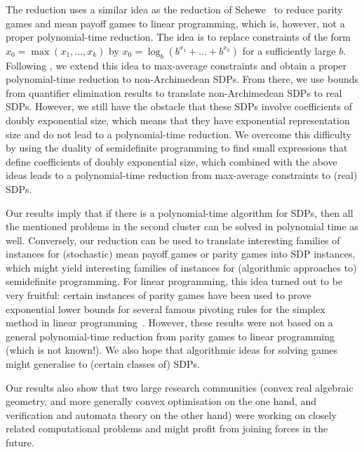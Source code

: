 \documentclass[11pt]{article}
\theoremstyle{definition}
\theoremstyle{remark}
\begin{document}
The reduction uses a similar idea as the reduction of Schewe~\cite{schewe2009parity} 
to reduce parity games and mean payoff games to linear programming, which is, however, not a proper polynomial-time reduction. The idea is to replace constraints of the form $x_0 = \max(x_1,\dots,x_k)$ by
$x_0 = \log_b(b^{x_1} + \dots + b^{x_k})$
for a sufficiently large $b$.
Following \cite{issac2016jsc}, we extend this idea to max-average constraints and obtain a proper polynomial-time reduction to non-Archimedean SDPs. 
From there, we use bounds from quantifier elimination results to translate non-Archimedean SDPs to real SDPs. However, we still have the obstacle that these SDPs involve coefficients of doubly exponential size, which means that they have exponential representation size and do not lead to a polynomial-time reduction. We overcome this difficulty by using the duality of semidefinite programming to find small expressions that define coefficients of doubly exponential size, which combined with the above ideas leads to a polynomial-time reduction from max-average constraints to (real) SDPs. 

Our results imply that if there is a  polynomial-time algorithm for SDPs,
then all the mentioned problems in the second cluster can be solved in polynomial time as well. 
Conversely, our reduction can be used to translate interesting families of instances for (stochastic) mean payoff games or parity games into SDP instances, which might yield interesting families of instances for (algorithmic approaches to) semidefinite programming. 
For linear programming, this idea turned out to be very fruitful: 
certain instances of parity games have been used to prove exponential lower bounds for several famous pivoting rules for the simplex method in linear programming~\cite{Friedmann2011b,friedmann_zadeh,FriedmannHZ14a,AvisF17,DisserFriedmannHopp:2023}.
However, these results were not based on a general polynomial-time reduction from parity games to linear programming (which is not known!). We also hope that algorithmic ideas for solving games might generalise to (certain classes of) SDPs. 

Our results also show that two large research communities (convex real algebraic geometry, and more generally convex optimisation on the one hand, and verification and automata theory on the other hand) were working on closely related computational problems and might profit from joining forces in the future. 
\end{document}
